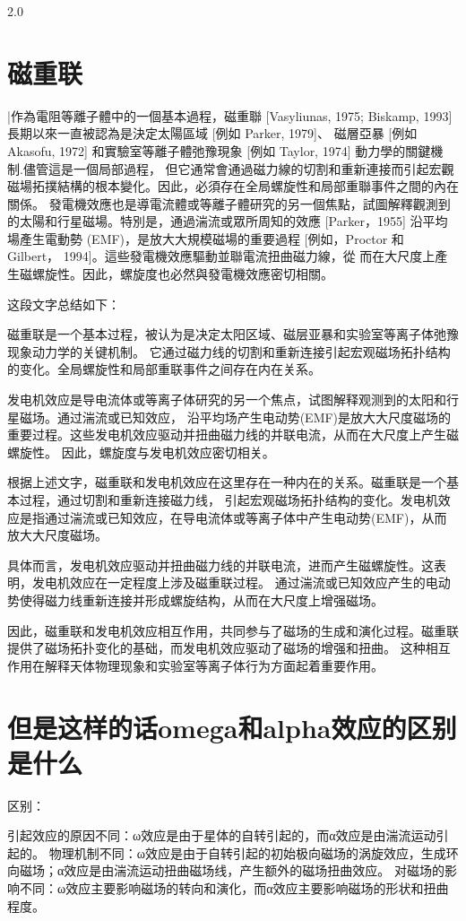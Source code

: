 \documentclass[12pt, a4paper, oneside]{ctexart}
\begin{document}
\begin{spacing}{2.0}
\section{磁重联}
|作為電阻等離子體中的一個基本過程，磁重聯 [Vasyliunas, 1975; Biskamp, 1993] 長期以來一直被認為是決定太陽區域 [例如 Parker, 1979]、
磁層亞暴 [例如 Akasofu, 1972] 和實驗室等離子體弛豫現象 [例如 Taylor, 1974] 動力學的關鍵機制.儘管這是一個局部過程，
但它通常會通過磁力線的切割和重新連接而引起宏觀磁場拓撲結構的根本變化。因此，必須存在全局螺旋性和局部重聯事件之間的內在關係。
發電機效應也是導電流體或等離子體研究的另一個焦點，試圖解釋觀測到的太陽和行星磁場。特別是，通過湍流或眾所周知的效應 [Parker，1955] 
沿平均場產生電動勢 (EMF)，是放大大規模磁場的重要過程 [例如，Proctor 和 Gilbert， 1994]。這些發電機效應驅動並聯電流扭曲磁力線，從
而在大尺度上產生磁螺旋性。因此，螺旋度也必然與發電機效應密切相關。

这段文字总结如下：

磁重联是一个基本过程，被认为是决定太阳区域、磁层亚暴和实验室等离子体弛豫现象动力学的关键机制。
它通过磁力线的切割和重新连接引起宏观磁场拓扑结构的变化。全局螺旋性和局部重联事件之间存在内在关系。

发电机效应是导电流体或等离子体研究的另一个焦点，试图解释观测到的太阳和行星磁场。通过湍流或已知效应，
沿平均场产生电动势(EMF)是放大大尺度磁场的重要过程。这些发电机效应驱动并扭曲磁力线的并联电流，从而在大尺度上产生磁螺旋性。
因此，螺旋度与发电机效应密切相关。

根据上述文字，磁重联和发电机效应在这里存在一种内在的关系。磁重联是一个基本过程，通过切割和重新连接磁力线，
引起宏观磁场拓扑结构的变化。发电机效应是指通过湍流或已知效应，在导电流体或等离子体中产生电动势(EMF)，从而放大大尺度磁场。

具体而言，发电机效应驱动并扭曲磁力线的并联电流，进而产生磁螺旋性。这表明，发电机效应在一定程度上涉及磁重联过程。
通过湍流或已知效应产生的电动势使得磁力线重新连接并形成螺旋结构，从而在大尺度上增强磁场。

因此，磁重联和发电机效应相互作用，共同参与了磁场的生成和演化过程。磁重联提供了磁场拓扑变化的基础，而发电机效应驱动了磁场的增强和扭曲。
这种相互作用在解释天体物理现象和实验室等离子体行为方面起着重要作用。




\section{但是这样的话omega和alpha效应的区别是什么}
区别：

引起效应的原因不同：ω效应是由于星体的自转引起的，而α效应是由湍流运动引起的。
物理机制不同：ω效应是由于自转引起的初始极向磁场的涡旋效应，生成环向磁场；α效应是由湍流运动扭曲磁场线，产生额外的磁场扭曲效应。
对磁场的影响不同：ω效应主要影响磁场的转向和演化，而α效应主要影响磁场的形状和扭曲程度。

\end{spacing}
\end{document}
